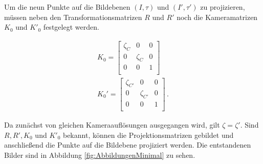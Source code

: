 %


Um die neun Punkte auf die Bildebenen $(I,\tau)$ und $(I',\tau')$ zu projizieren, müssen neben den Transformationsmatrizen $R$ und $R'$ noch die Kameramatrizen $K_0$ und $K'_0$ festgelegt werden.


\begin{gather}		
K_0 =
\begin{bmatrix}
\zeta_{C}&0&0\\
0&\zeta_{C}&0\\
0&0&1\\
\end{bmatrix}\label{eq:eq4.9}\\
K_0' =
\begin{bmatrix}
\zeta_{C'}&0&0\\
0&\zeta_{C'}&0\\
0&0&1\\
\end{bmatrix}\, .\label{eq:eq4.10}
\end{gather}

Da zunächst von gleichen Kameraauflösungen ausgegangen wird, gilt $\zeta = \zeta'$. Sind $R,R',K_0$ und $K'_0$ bekannt, können die Projektionsmatrizen gebildet und anschließend die Punkte auf die Bildebene projiziert werden. Die entstandenen Bilder sind in Abbildung \ref{fig:AbbildungenMinimal} zu sehen.  



